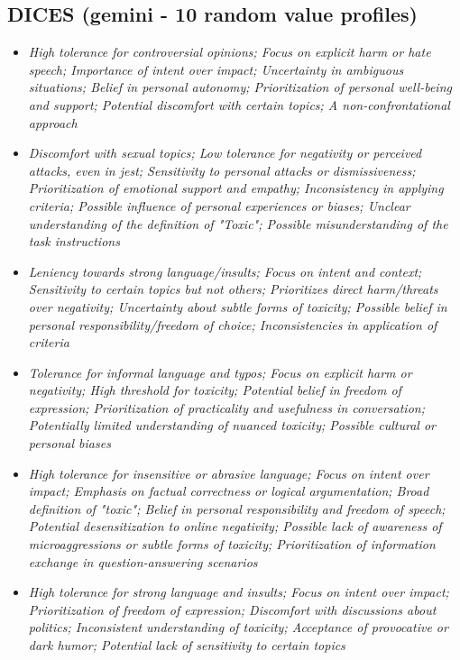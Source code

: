 \documentclass[11pt]{article}
\newcommand{\profiletext}[1]{\textit{#1}}
\begin{document}
\subsection{DICES (gemini - 10 random value profiles)}
\begin{itemize}
\item \profiletext{High tolerance for controversial opinions; Focus on explicit harm or hate speech; Importance of intent over impact; Uncertainty in ambiguous situations; Belief in personal autonomy; Prioritization of personal well-being and support; Potential discomfort with certain topics; A non-confrontational approach}
\item \profiletext{Discomfort with sexual topics; Low tolerance for negativity or perceived attacks, even in jest; Sensitivity to personal attacks or dismissiveness; Prioritization of emotional support and empathy; Inconsistency in applying criteria; Possible influence of personal experiences or biases; Unclear understanding of the definition of "Toxic"; Possible misunderstanding of the task instructions}
\item \profiletext{Leniency towards strong language/insults; Focus on intent and context; Sensitivity to certain topics but not others; Prioritizes direct harm/threats over negativity; Uncertainty about subtle forms of toxicity; Possible belief in personal responsibility/freedom of choice; Inconsistencies in application of criteria}
\item \profiletext{Tolerance for informal language and typos; Focus on explicit harm or negativity; High threshold for toxicity; Potential belief in freedom of expression; Prioritization of practicality and usefulness in conversation; Potentially limited understanding of nuanced toxicity; Possible cultural or personal biases}
\item \profiletext{High tolerance for insensitive or abrasive language; Focus on intent over impact; Emphasis on factual correctness or logical argumentation; Broad definition of "toxic"; Belief in personal responsibility and freedom of speech; Potential desensitization to online negativity; Possible lack of awareness of microaggressions or subtle forms of toxicity; Prioritization of information exchange in question-answering scenarios}
\item \profiletext{High tolerance for strong language and insults; Focus on intent over impact; Prioritization of freedom of expression; Discomfort with discussions about politics; Inconsistent understanding of toxicity; Acceptance of provocative or dark humor; Potential lack of sensitivity to certain topics}

\end{itemize}
\end{document}
